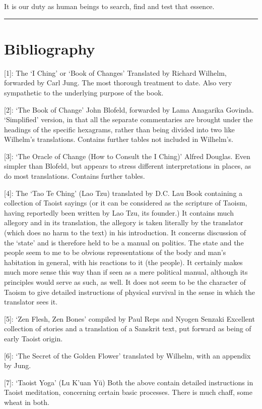\documentclass[11pt]{book}
\begin{document}
It is our duty as human beings to search, find and test that essence.

\begin{center}\rule{0.5\linewidth}{0.5pt}\end{center}

\newpage
\hypertarget{bibliography}{%
\section{Bibliography}\label{bibliography}}

{[}1{]}: The `I Ching' or `Book of Changes' Translated by Richard Wilhelm, forwarded by Carl Jung. The most thorough treatment to date. Also very sympathetic to the underlying purpose of the book.

{[}2{]}: `The Book of Change' John Blofeld, forwarded by Lama Anagarika Govinda. `Simplified' version, in that all the separate commentaries are brought under the headings of the specific hexagrams, rather than being divided into two like Wilhelm's translations. Contains further tables not included in Wilhelm's.

{[}3{]}: `The Oracle of Change (How to Consult the I Ching)' Alfred Douglas. Even simpler than Blofeld, but appears to stress different interpretations in places, as do most translations. Contains further tables.

{[}4{]}: The `Tao Te Ching' (Lao Tzu) translated by D.C. Lau Book containing a collection of Taoist sayings (or it can be considered as the scripture of Taoism, having reportedly been written by Lao Tzu, its founder.) It contains much allegory and in its translation, the allegory is taken literally by the translator (which does no harm to the text) in his introduction. It concerns discussion of the `state' and is therefore held to be a manual on politics. The state and the people seem to me to be obvious representations of the body and man's habitation in general, with his reactions to it (the people). It certainly makes much more sense this way than if seen as a mere political manual, although its principles would serve as such, as well. It does not seem to be the character of Taoism to give detailed instructions of physical survival in the sense in which the translator sees it.

{[}5{]}: `Zen Flesh, Zen Bones' compiled by Paul Reps and Nyogen Senzaki Excellent collection of stories and a translation of a Sanskrit text, put forward as being of early Taoist origin.

{[}6{]}: `The Secret of the Golden Flower' translated by Wilhelm, with an appendix by Jung.

{[}7{]}: `Taoist Yoga' (Lu K'uan Yü) Both the above contain detailed instructions in Taoist meditation, concerning certain basic processes. There is much chaff, some wheat in both.

\end{document}
